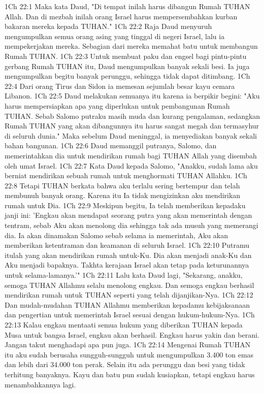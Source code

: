 1Ch 22:1  Maka kata Daud, "Di tempat inilah harus dibangun Rumah TUHAN Allah. Dan di mezbah inilah orang Israel harus mempersembahkan kurban bakaran mereka kepada TUHAN."
1Ch 22:2  Raja Daud menyuruh mengumpulkan semua orang asing yang tinggal di negeri Israel, lalu ia mempekerjakan mereka. Sebagian dari mereka memahat batu untuk membangun Rumah TUHAN.
1Ch 22:3  Untuk membuat paku dan engsel bagi pintu-pintu gerbang Rumah TUHAN itu, Daud mengumpulkan banyak sekali besi. Ia juga mengumpulkan begitu banyak perunggu, sehingga tidak dapat ditimbang.
1Ch 22:4  Dari orang Tirus dan Sidon ia memesan sejumlah besar kayu cemara Libanon.
1Ch 22:5  Daud melakukan semuanya itu karena ia berpikir begini: "Aku harus mempersiapkan apa yang diperlukan untuk pembangunan Rumah TUHAN. Sebab Salomo putraku masih muda dan kurang pengalaman, sedangkan Rumah TUHAN yang akan dibangunnya itu harus sangat megah dan termasyhur di seluruh dunia." Maka sebelum Daud meninggal, ia menyediakan banyak sekali bahan bangunan.
1Ch 22:6  Daud memanggil putranya, Salomo, dan memerintahkan dia untuk mendirikan rumah bagi TUHAN Allah yang disembah oleh umat Israel.
1Ch 22:7  Kata Daud kepada Salomo, "Anakku, sudah lama aku berniat mendirikan sebuah rumah untuk menghormati TUHAN Allahku.
1Ch 22:8  Tetapi TUHAN berkata bahwa aku terlalu sering bertempur dan telah membunuh banyak orang. Karena itu Ia tidak mengizinkan aku mendirikan rumah untuk Dia.
1Ch 22:9  Meskipun begitu, Ia telah memberikan kepadaku janji ini: 'Engkau akan mendapat seorang putra yang akan memerintah dengan tentram, sebab Aku akan menolong dia sehingga tak ada musuh yang memerangi dia. Ia akan dinamakan Salomo sebab selama ia memerintah, Aku akan memberikan ketentraman dan keamanan di seluruh Israel.
1Ch 22:10  Putramu itulah yang akan mendirikan rumah untuk-Ku. Dia akan menjadi anak-Ku dan Aku menjadi bapaknya. Takhta kerajaan Israel akan tetap pada keturunannya untuk selama-lamanya.'"
1Ch 22:11  Lalu kata Daud lagi, "Sekarang, anakku, semoga TUHAN Allahmu selalu menolong engkau. Dan semoga engkau berhasil mendirikan rumah untuk TUHAN seperti yang telah dijanjikan-Nya.
1Ch 22:12  Dan mudah-mudahan TUHAN Allahmu memberikan kepadamu kebijaksanaan dan pengertian untuk memerintah Israel sesuai dengan hukum-hukum-Nya.
1Ch 22:13  Kalau engkau mentaati semua hukum yang diberikan TUHAN kepada Musa untuk bangsa Israel, engkau akan berhasil. Engkau harus yakin dan berani. Jangan takut menghadapi apa pun juga.
1Ch 22:14  Mengenai Rumah TUHAN itu aku sudah berusaha sungguh-sungguh untuk mengumpulkan 3.400 ton emas dan lebih dari 34.000 ton perak. Selain itu ada perunggu dan besi yang tidak terhitung banyaknya. Kayu dan batu pun sudah kusiapkan, tetapi engkau harus menambahkannya lagi.
